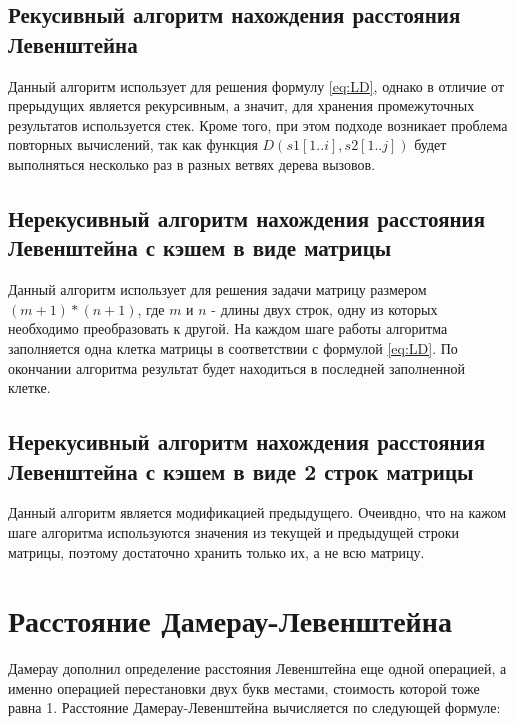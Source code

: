 \documentclass{report}
\begin{document}
\subsection{Рекусивный алгоритм нахождения расстояния Левенштейна}\label{rd}
Данный алгоритм использует для решения формулу \ref{eq:LD}, однако в отличие от прерыдущих является рекурсивным, а значит, для хранения промежуточных результатов используется стек. Кроме того, при этом подходе возникает проблема повторных вычислений, так как функция $D(s1[1..i], s2[1..j])$ будет выполняться несколько раз в разных ветвях дерева вызовов.

\subsection{Нерекусивный алгоритм нахождения расстояния Левенштейна с кэшем в виде матрицы}
Данный алгоритм использует для решения задачи матрицу размером $(m + 1) * (n + 1)$, где $m$ и $n$ - длины двух строк, одну из которых необходимо преобразовать к другой. На каждом шаге работы алгоритма заполняется одна клетка матрицы в соответствии с формулой \ref{eq:LD}. По окончании алгоритма результат будет находиться в последней заполненной клетке.

\subsection{Нерекусивный алгоритм нахождения расстояния Левенштейна с кэшем в виде 2 строк матрицы}
Данный алгоритм является модификацией предыдущего. Очеивдно, что на кажом шаге алгоритма используются значения из текущей и предыдущей строки матрицы, поэтому достаточно хранить только их, а не всю матрицу.

\section{Расстояние Дамерау-Левенштейна}

Дамерау дополнил определение расстояния Левенштейна еще одной операцией, а именно операцией перестановки двух букв местами, стоимость которой тоже равна 1. Расстояние Дамерау-Левенштейна вычисляется по следующей формуле:
\end{document}

